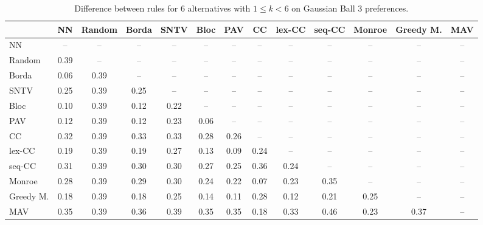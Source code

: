 
\begin{table*}[htbp]
\centering
\begin{tabular}{lcccccccccccc}
\toprule
 & NN & Random & Borda & SNTV & Bloc & PAV & CC & lex-CC & seq-CC & Monroe & Greedy M. & MAV \\
\midrule
NN & -- & -- & -- & -- & -- & -- & -- & -- & -- & -- & -- & -- \\
Random & \cellcolor{blue!39} 0.39 & -- & -- & -- & -- & -- & -- & -- & -- & -- & -- & -- \\
Borda & \cellcolor{blue!6} 0.06 & \cellcolor{blue!39} 0.39 & -- & -- & -- & -- & -- & -- & -- & -- & -- & -- \\
SNTV & \cellcolor{blue!25} 0.25 & \cellcolor{blue!39} 0.39 & \cellcolor{blue!25} 0.25 & -- & -- & -- & -- & -- & -- & -- & -- & -- \\
Bloc & \cellcolor{blue!10} 0.10 & \cellcolor{blue!39} 0.39 & \cellcolor{blue!12} 0.12 & \cellcolor{blue!22} 0.22 & -- & -- & -- & -- & -- & -- & -- & -- \\
PAV & \cellcolor{blue!12} 0.12 & \cellcolor{blue!39} 0.39 & \cellcolor{blue!12} 0.12 & \cellcolor{blue!23} 0.23 & \cellcolor{blue!6} 0.06 & -- & -- & -- & -- & -- & -- & -- \\
CC & \cellcolor{blue!32} 0.32 & \cellcolor{blue!39} 0.39 & \cellcolor{blue!33} 0.33 & \cellcolor{blue!33} 0.33 & \cellcolor{blue!28} 0.28 & \cellcolor{blue!26} 0.26 & -- & -- & -- & -- & -- & -- \\
lex-CC & \cellcolor{blue!19} 0.19 & \cellcolor{blue!39} 0.39 & \cellcolor{blue!19} 0.19 & \cellcolor{blue!27} 0.27 & \cellcolor{blue!13} 0.13 & \cellcolor{blue!9} 0.09 & \cellcolor{blue!24} 0.24 & -- & -- & -- & -- & -- \\
seq-CC & \cellcolor{blue!31} 0.31 & \cellcolor{blue!39} 0.39 & \cellcolor{blue!30} 0.30 & \cellcolor{blue!30} 0.30 & \cellcolor{blue!27} 0.27 & \cellcolor{blue!25} 0.25 & \cellcolor{blue!36} 0.36 & \cellcolor{blue!24} 0.24 & -- & -- & -- & -- \\
Monroe & \cellcolor{blue!28} 0.28 & \cellcolor{blue!39} 0.39 & \cellcolor{blue!28} 0.29 & \cellcolor{blue!30} 0.30 & \cellcolor{blue!24} 0.24 & \cellcolor{blue!22} 0.22 & \cellcolor{blue!7} 0.07 & \cellcolor{blue!23} 0.23 & \cellcolor{blue!35} 0.35 & -- & -- & -- \\
Greedy M. & \cellcolor{blue!18} 0.18 & \cellcolor{blue!39} 0.39 & \cellcolor{blue!18} 0.18 & \cellcolor{blue!25} 0.25 & \cellcolor{blue!14} 0.14 & \cellcolor{blue!11} 0.11 & \cellcolor{blue!28} 0.28 & \cellcolor{blue!12} 0.12 & \cellcolor{blue!21} 0.21 & \cellcolor{blue!25} 0.25 & -- & -- \\
MAV & \cellcolor{blue!35} 0.35 & \cellcolor{blue!39} 0.39 & \cellcolor{blue!36} 0.36 & \cellcolor{blue!39} 0.39 & \cellcolor{blue!35} 0.35 & \cellcolor{blue!35} 0.35 & \cellcolor{blue!18} 0.18 & \cellcolor{blue!33} 0.33 & \cellcolor{blue!46} 0.46 & \cellcolor{blue!23} 0.23 & \cellcolor{blue!37} 0.37 & -- \\
\bottomrule
\end{tabular}

\caption{Difference between rules for 6 alternatives with $1 \leq k < 6$ on Gaussian Ball 3 preferences.}
\label{tab:rule_distance_heatmap-m=[6]-pref_dist=euclidean__args__dimensions=3_-_space=gaussian_ball}
\end{table*}
    